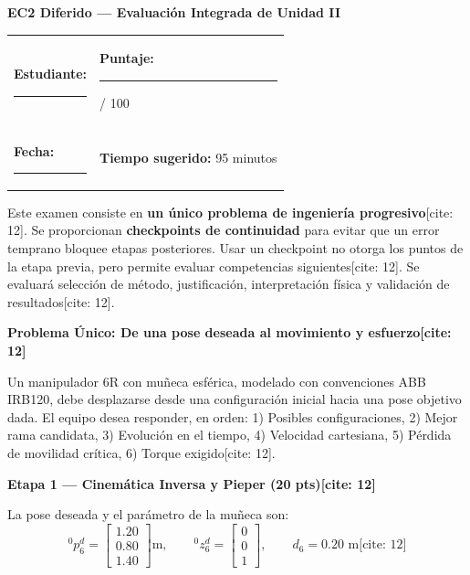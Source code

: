\documentclass[11pt, a4paper]{article}
\begin{document}
\begin{center}
    \Large\textbf{\textcolor{ucbblue}{EC2 Diferido — Evaluación Integrada de Unidad II}}\\[0.2cm]
\end{center}

\begin{tabular}{ll}
\textbf{Estudiante:} \rule{8cm}{0.15mm} & \textbf{Puntaje:} \rule{2cm}{0.15mm} / 100 \\
\textbf{Fecha:} \rule{4cm}{0.15mm} & \textbf{Tiempo sugerido:} 95 minutos
\end{tabular}

\vspace{0.3cm}
\begin{tcolorbox}[colback=gray!5, colframe=black, title=\textbf{Instrucciones Generales}, left=1mm, right=1mm, top=1mm, bottom=1mm]
    \small
    Este examen consiste en \textbf{un único problema de ingeniería progresivo}[cite: 12]. Se proporcionan \textbf{checkpoints de continuidad} para evitar que un error temprano bloquee etapas posteriores. Usar un checkpoint no otorga los puntos de la etapa previa, pero permite evaluar competencias siguientes[cite: 12]. Se evaluará selección de método, justificación, interpretación física y validación de resultados[cite: 12].
\end{tcolorbox}

\noindent\textbf{\large Problema Único: De una pose deseada al movimiento y esfuerzo[cite: 12]}

Un manipulador 6R con muñeca esférica, modelado con convenciones ABB IRB120, debe desplazarse desde una configuración inicial hacia una pose objetivo dada. El equipo desea responder, en orden: 1) Posibles configuraciones, 2) Mejor rama candidata, 3) Evolución en el tiempo, 4) Velocidad cartesiana, 5) Pérdida de movilidad crítica, 6) Torque exigido[cite: 12].

\noindent\textbf{\large Etapa 1 — Cinemática Inversa y Pieper (20 pts)[cite: 12]}

La pose deseada y el parámetro de la muñeca son:
\begin{equation*}
    {}^0p_6^d = \begin{bmatrix} 1.20 \\ 0.80 \\ 1.40 \end{bmatrix}\text{m}, \qquad {}^0z_6^d = \begin{bmatrix} 0 \\ 0 \\ 1 \end{bmatrix}, \qquad d_6 = 0.20\text{ m} \text{[cite: 12]}
\end{equation*}
\end{document}
